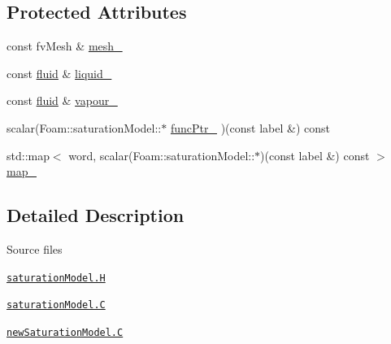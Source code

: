 \subsection*{Protected Attributes}
\begin{DoxyCompactItemize}
\item 
const fv\+Mesh \& \hyperlink{classFoam_1_1saturationModel_a23edeeeecebcef11921a33dd5d990570}{mesh\+\_\+}
\item 
const \hyperlink{classFoam_1_1fluid}{fluid} \& \hyperlink{classFoam_1_1saturationModel_a908415555f3c334379400a3eb5759639}{liquid\+\_\+}
\item 
const \hyperlink{classFoam_1_1fluid}{fluid} \& \hyperlink{classFoam_1_1saturationModel_a2675e35060f71c22823e4a0b3c816dad}{vapour\+\_\+}
\item 
scalar(Foam\+::saturation\+Model\+::$\ast$ \hyperlink{classFoam_1_1saturationModel_a3916a5fe849e3553b2a19270255cc791}{func\+Ptr\+\_\+} )(const label \&) const
\item 
std\+::map$<$ word, scalar(Foam\+::saturation\+Model\+::$\ast$)(const label \&) const  $>$ \hyperlink{classFoam_1_1saturationModel_a9bd85ba5786a73880ae096c2733fa366}{map\+\_\+}
\end{DoxyCompactItemize}


\subsection{Detailed Description}
\label{_Description}%
 \begin{DoxyParagraph}{Source files}

\begin{DoxyItemize}
\item \href{../../../home/carlo/data/GeN-Foam/GeN-Foam_ffn/GeN-Foam/GeN-Foam/classes/thermalHydraulics/src/physicsModels/phaseChangeModels/saturationModels/saturationModel.H}{\tt saturation\+Model.\+H} 
\item \href{../../../home/carlo/data/GeN-Foam/GeN-Foam_ffn/GeN-Foam/GeN-Foam/classes/thermalHydraulics/src/physicsModels/phaseChangeModels/saturationModels/saturationModel.C}{\tt saturation\+Model.\+C} 
\item \href{../../../home/carlo/data/GeN-Foam/GeN-Foam_ffn/GeN-Foam/GeN-Foam/classes/thermalHydraulics/src/physicsModels/phaseChangeModels/saturationModels/newSaturationModel.C}{\tt new\+Saturation\+Model.\+C} 
\end{DoxyItemize}
\end{DoxyParagraph}



